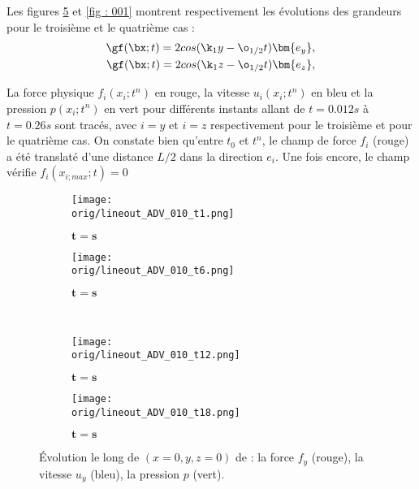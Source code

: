 

Les figures \ref{fig : 010} et \ref{fig : 001} montrent respectivement les évolutions des grandeurs pour le troisième et le quatrième cas :
\begin{align*}
\gf(\bx;t) = 2cos(\k_1 y - \o_{1/2}t) \bm{e_y}, \\ 
\gf(\bx;t) = 2cos(\k_1 z - \o_{1/2}t) \bm{e_z},
\end{align*} 

La force physique $f_i(x_i;t^n)$ en rouge, la vitesse $u_i(x_i;t^n)$ en bleu et la pression $p(x_i;t^n)$ en vert pour différents instants allant de $t=0.012s$ à $t=0.26s$ sont tracés, avec $i=y$ et $i=z$ respectivement pour le troisième et pour le quatrième cas. On constate bien qu'entre $t_0$ et $t^n $, le champ de force $f_i$ (rouge) a été translaté d'une distance $L/2$ dans la direction $e_i$.  Une fois encore, le champ vérifie $f_i(x_{i;max};t)=0$

\begin{figure}
\begin{center}
	\begin{subfigure}[t]{0.4\textwidth}                                                                                                                                   
		\texttt{[image: \\orig/lineout\_ADV\_010\_t1.png]}
		\caption{ $\bm{t=s}$}
		\label{fig : 010_t1}
	\end{subfigure}\hfill
	\begin{subfigure}[t]{0.4\textwidth}
		\texttt{[image: \\orig/lineout\_ADV\_010\_t6.png]}
		\caption{ $\bm{t=s}$}
		\label{fig : 010_t6}
	\end{subfigure}
\\
	\begin{subfigure}[t]{0.4\textwidth}
		\texttt{[image: \\orig/lineout\_ADV\_010\_t12.png]}
		\caption{ $\bm{t=s}$}
		\label{fig : 010_t11}
	\end{subfigure}\hfill
	\begin{subfigure}[t]{0.4\textwidth}
		\texttt{[image: \\orig/lineout\_ADV\_010\_t18.png]}
		\caption{ $\bm{t=s}$}
		\label{fig : 010_t16}
	\end{subfigure}
\end{center}
\caption{Évolution le long de $(x=0,y,z=0)$ de : la force $f_y$ (rouge), la vitesse $u_y$ (bleu), la pression $p$ (vert).}
\label{fig : 010}
\end{figure}

